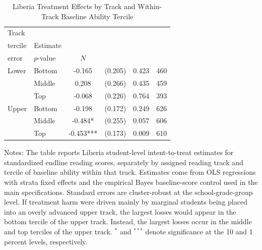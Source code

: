\begin{table}[htbp]
\caption{Liberia Treatment Effects by Track and Within-Track Baseline Ability Tercile}
\label{tab:track_bins}
\begin{center}
\begin{small}
\begin{threeparttable}
\begin{tabular}{llcccc}
\toprule
Track & \Longstack{Ability\\ tercile} & Estimate & \Longstack{Standard\\ error} & $p$-value & $N$ \\
\midrule
Lower & Bottom & -0.165 & (0.205) & 0.423 & 460 \\
 & Middle & 0.208 & (0.266) & 0.435 & 459 \\
 & Top & -0.068 & (0.226) & 0.764 & 393 \\
Upper & Bottom & -0.198 & (0.172) & 0.249 & 626 \\
 & Middle & -0.484* & (0.255) & 0.057 & 606 \\
 & Top & -0.453*** & (0.173) & 0.009 & 610 \\
\bottomrule
\end{tabular}
\begin{tablenotes}
\footnotesize \item Notes: The table reports Liberia student-level intent-to-treat estimates for standardized endline reading scores, separately by assigned reading track and tercile of baseline ability within that track. Estimates come from OLS regressions with strata fixed effects and the empirical Bayes baseline-score control used in the main specifications. Standard errors are cluster-robust at the school-grade-group level. If treatment harm were driven mainly by marginal students being placed into an overly advanced upper track, the largest losses would appear in the bottom tercile of the upper track. Instead, the largest losses occur in the middle and top terciles of the upper track. $^*$ and $^{***}$ denote significance at the 10 and 1 percent levels, respectively.
\end{tablenotes}
\end{threeparttable}
\end{small}
\end{center}
\end{table}